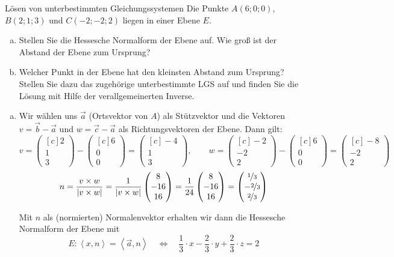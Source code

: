 \documentclass[german]{../spicker}
\newcommand{\scalarprod}[1]{\left\langle #1 \right\rangle}
\newcommand{\vektor}[1]{\begin{pmatrix*}[c] #1 \end{pmatrix*}}
\renewcommand{\abs}[1]{\left| #1 \right|}
\begin{document}
\begin{example}{Lösen von unterbestimmten Gleichungssystemen}
    Die Punkte $A(6;0;0)$, $B(2;1;3)$ und $C(-2;-2;2)$ liegen in einer Ebene $E$.
    \begin{enumerate}[a)]
        \item Stellen Sie die Hessesche Normalform der Ebene auf.
              Wie groß ist der Abstand der Ebene zum Ursprung?
        \item Welcher Punkt in der Ebene hat den kleinsten Abstand zum Ursprung?
              Stellen Sie dazu das zugehörige unterbestimmte LGS auf und finden Sie die Lösung mit Hilfe der verallgemeinerten Inverse.
    \end{enumerate}

    \exampleseparator

    \begin{enumerate}[a)]
        \item Wir wählen uns $\vec{a}$ (Ortsvektor von $A$) als Stützvektor und die Vektoren $v = \vec{b} - \vec{a}$ und $w = \vec{c} - \vec{a}$ als Richtungsvektoren der Ebene.
              Dann gilt:
              $$
                  v = \vektor{2\\1\\3} - \vektor{6\\0\\0} = \vektor{-4\\1\\3}, \qquad w = \vektor{-2\\-2\\2} - \vektor{6\\0\\0} = \vektor{-8\\-2\\2}
              $$
              $$
                  n = \frac{v \times w}{\abs{v \times w}} = \frac{1}{\abs{v \times w}} \vektor{8 \\ -16 \\ 16} = \frac{1}{24} \vektor{8 \\ -16 \\ 16} = \vektor{\nicefrac{1}{3} \\ -\nicefrac{2}{3} \\ \nicefrac{2}{3}}
              $$

              Mit $n$ als (normierten) Normalenvektor erhalten wir dann die Hessesche Normalform der Ebene mit
              $$
                  E: \scalarprod{x,n} = \scalarprod{\vec{a}, n} \quad \iff \quad \frac{1}{3} \cdot x - \frac{2}{3} \cdot y + \frac{2}{3} \cdot z = 2
              $$


\end{enumerate}
\end{example}
\end{document}
